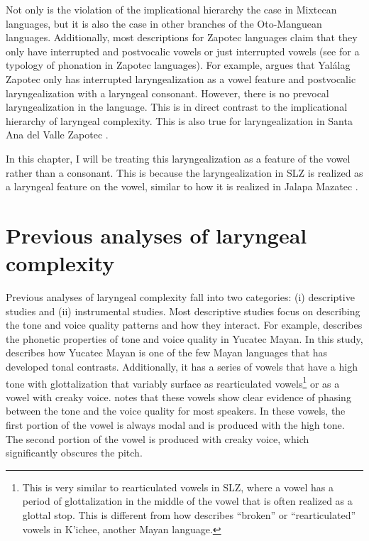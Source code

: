 Not only is the violation of the implicational hierarchy the case in Mixtecan languages, but it is also the case in other branches of the Oto-Manguean languages. Additionally, most descriptions for Zapotec languages claim that they only have interrupted and postvocalic vowels or just interrupted vowels (see \cite{ariza-garciaPhonationTypesTones2018} for a typology of phonation in Zapotec languages). For example, \citet{avelinoTopicsYalalagZapotec2004,avelinoAcousticElectroglottographicAnalyses2010} argues that Yalálag Zapotec only has interrupted laryngealization as a vowel feature and postvocalic laryngealization with a laryngeal consonant. However, there is no prevocal laryngealization in the language. This is in direct contrast to the implicational hierarchy of laryngeal complexity. This is also true for laryngealization in Santa Ana del Valle Zapotec \citep{espositoSantaAnaValle2004,espositoAcousticElectroglottographicStudy2012}.

In this chapter, I will be treating this laryngealization as a feature of the vowel rather than a consonant. This is because the laryngealization in SLZ is realized as a laryngeal feature on the vowel, similar to how it is realized in Jalapa Mazatec \citep{kirkQuantifyingAcousticProperties1993,garellekAcousticConsequencesPhonation2011}. 

\section{Previous analyses of laryngeal complexity}\label{sec:previous_analyses}

Previous analyses of laryngeal complexity fall into two categories: (i) descriptive studies and (ii) instrumental studies. Most descriptive studies focus on describing the tone and voice quality patterns and how they interact. For example, \citet{frazierPhoneticsYucatecMaya2013} describes the phonetic properties of tone and voice quality in Yucatec Mayan. In this study, \citeauthor{frazierPhoneticsYucatecMaya2013} describes how Yucatec Mayan is one of the few Mayan languages that has developed tonal contrasts. Additionally, it has a series of vowels that have a high tone with glottalization that variably surface as rearticulated vowels\footnote{This is very similar to rearticulated vowels in SLZ, where a vowel has a period of glottalization in the middle of the vowel that is often realized as a glottal stop. This is different from how \citet{bairdPhoneticPhonologicalRealizations2011} describes ``broken'' or ``rearticulated'' vowels in K'ichee, another Mayan language.} or as a vowel with creaky voice. \citeauthor{frazierPhoneticsYucatecMaya2013} notes that these vowels show clear evidence of phasing between the tone and the voice quality for most speakers. In these vowels, the first portion of the vowel is always modal and is produced with the high tone. The second portion of the vowel is produced with creaky voice, which significantly obscures the pitch. 

